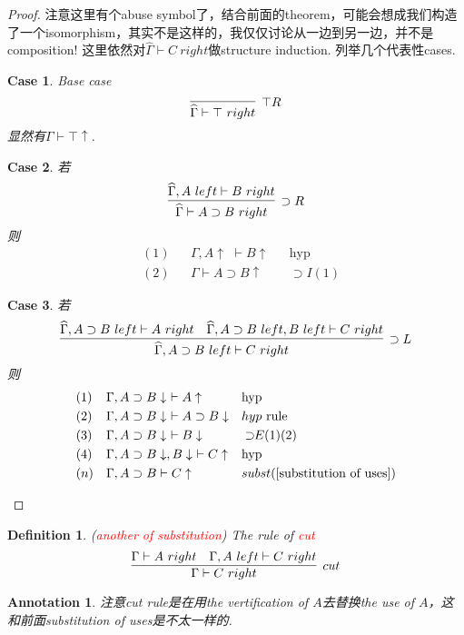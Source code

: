 \documentclass{article}
\theoremstyle{plain}
\newtheorem{definition}[theorem]{Definition}
\newtheorem{annotation}[theorem]{Annotation}
\newcounter{case}
\newtheorem{case}{Case}
\theoremstyle{nonumberplain}
\newtheorem{proof}{Proof}
\newcommand{\redt}[1]{\textcolor{red}{#1}}
\begin{document}
\begin{proof}
\rm 注意这里有个abuse symbol了，结合前面的theorem，可能会想成我们构造了一个isomorphism，其实不是这样的，我仅仅讨论从一边到另一边，并不是composition! 这里依然对$\widehat{\Gamma} \vdash C~right$做structure induction. 列举几个代表性cases.
\begin{case} Base case
$$
\infer[\top R]{\widehat{\Gamma} \vdash \top~right}{}
$$
显然有$\Gamma \vdash \top \uparrow$.
\end{case}
\begin{case}若
$$
\infer[\supset R]{\widehat{\Gamma} \vdash A \supset B~right}{\widehat{\Gamma}, A~left \vdash B~right}
$$
则
$$
\begin{aligned}
&(1) && \Gamma,A \uparrow\,\, \vdash B \uparrow && \text{hyp} \\
&(2) && \Gamma \vdash A \supset B \uparrow && \supset I(1)
\end{aligned}
$$
\end{case}
\begin{case} 若
$$
\infer[\supset L]{\widehat{\Gamma}, A \supset B~left \vdash C~right}{\widehat{\Gamma}, A \supset B~left \vdash A~right & \widehat{\Gamma}, A \supset B~left, B~left \vdash C~right}
$$
则
$$
\begin{aligned}
&(1) && \Gamma, A \supset B \downarrow\,\, \vdash A \uparrow && \text{hyp} \\
&(2) && \Gamma, A \supset B \downarrow\,\, \vdash A \supset B \downarrow && hyp~\text{rule} \\
&(3) && \Gamma, A \supset B \downarrow\,\, \vdash B \downarrow && \supset\!\! E(1)(2) \\
&(4) && \Gamma, A \supset B \downarrow, B \downarrow\,\, \vdash C \uparrow && \text{hyp}\\
&(n) &&\Gamma, A \supset B \vdash C \uparrow  && subst(\ref{substitution of uses})
\end{aligned}
$$
\end{case}

\end{proof}

\begin{definition}
\rm (\redt{another of substitution}) The rule of \redt{cut}
$$
\infer[cut]{\Gamma \vdash C~right}{\Gamma \vdash A~right & \Gamma, A~left \vdash C~right}
$$
\end{definition}

\begin{annotation}
\rm 注意\emph{cut} rule是在用the vertification of $A$去替换the use of $A$，这和前面substitution of uses是不太一样的. 
\end{annotation}
\end{document}
